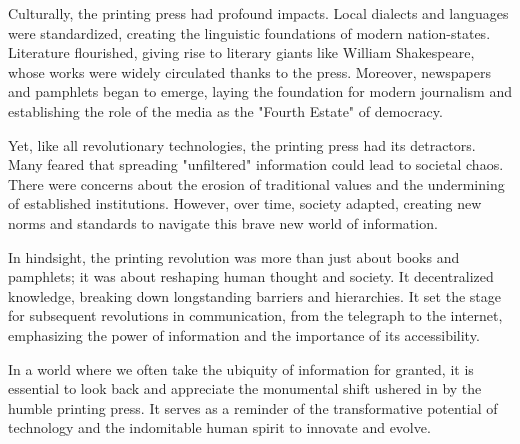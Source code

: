 Culturally, the printing press had profound impacts. Local dialects and languages were standardized, creating the linguistic foundations of modern nation-states. Literature flourished, giving rise to literary giants like William Shakespeare, whose works were widely circulated thanks to the press. Moreover, newspapers and pamphlets began to emerge, laying the foundation for modern journalism and establishing the role of the media as the "Fourth Estate" of democracy.

Yet, like all revolutionary technologies, the printing press had its detractors. Many feared that spreading "unfiltered" information could lead to societal chaos. There were concerns about the erosion of traditional values and the undermining of established institutions. However, over time, society adapted, creating new norms and standards to navigate this brave new world of information.

In hindsight, the printing revolution was more than just about books and pamphlets; it was about reshaping human thought and society. It decentralized knowledge, breaking down longstanding barriers and hierarchies. It set the stage for subsequent revolutions in communication, from the telegraph to the internet, emphasizing the power of information and the importance of its accessibility.

In a world where we often take the ubiquity of information for granted, it is essential to look back and appreciate the monumental shift ushered in by the humble printing press. It serves as a reminder of the transformative potential of technology and the indomitable human spirit to innovate and evolve.
